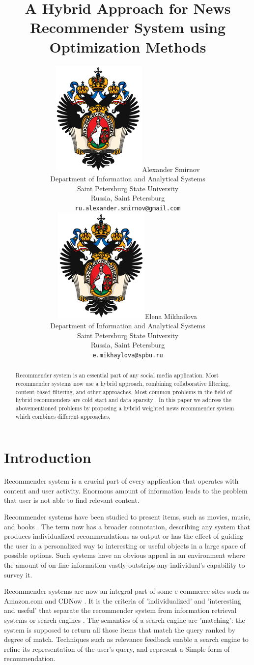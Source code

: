 \documentclass{article}
\title{A Hybrid Approach for News Recommender System using Optimization Methods}
\author{
    {\includegraphics[scale=0.07]{./images/spbu.png}\hspace{1mm}Alexander Smirnov}\\
	Department of Information and Analytical Systems\\
	Saint Petersburg State University\\
	Russia, Saint Petersburg\\
	\texttt{ru.alexander.smirnov@gmail.com} \\
	\And
	{\includegraphics[scale=0.07]{images/spbu.png}\hspace{1mm}Elena Mikhailova} \\
	Department of Information and Analytical Systems\\
	Saint Petersburg State University\\
	Russia, Saint Petersburg\\
	\texttt{e.mikhaylova@spbu.ru} \\
}
\begin{document}
\maketitle

\begin{abstract}


    Recommender system is an essential part of any social media application. Most recommender systems now use a hybrid approach, combining collaborative filtering, content-based filtering, and other approaches. Most common problems in the field of hybrid recommenders are cold start and data sparsity \citep{overview}. In this paper we address the abovementioned problems by proposing a hybrid weighted news recommender system which combines different approaches.

\end{abstract}





\section{Introduction}




    Recommender system is a crucial part of every application that operates with content and user activity. Enormous amount of information leads to the problem that user is not able to find relevant content.

    Recommender systems have been studied to present items, such as movies, music, and books \citep{movies} \citep{films} \citep{books}. The term now has a broader connotation, describing any system that produces individualized recommendations as output or has the effect of guiding the user in a personalized way to interesting or useful objects in a large space of possible options. Such systems have an obvious appeal in an environment where the amount of on-line information vastly outstrips any individual’s capability to survey it.

    Recommender systems are now an integral part of some e-commerce sites such as Amazon.com and CDNow \citep{commerce}. It is the criteria of ’individualized’ and ’interesting and useful’ that separate the recommender system from information retrieval systems or search engines \citep{coin}. The semantics of a search engine are ’matching’: the system is supposed to return all those items that match the query ranked by degree of match.  Techniques such as relevance feedback enable a search engine to refine its representation of the user’s query, and represent a Simple form of recommendation.
\end{document}
